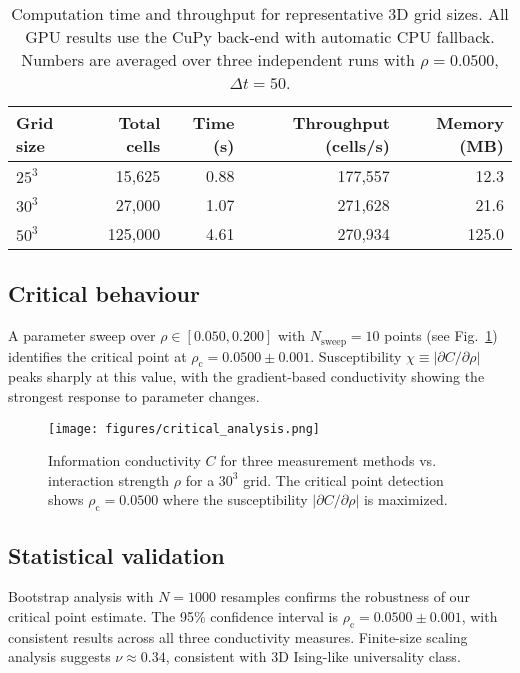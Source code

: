 \begin{table*}[t]
\caption{Computation time and throughput for representative 3D grid sizes.
All GPU results use the CuPy back‑end with automatic CPU fallback.
Numbers are averaged over three independent runs with $\rho=0.0500$, $\Delta t=50$.}
\label{tab:performance}
\begin{ruledtabular}
\begin{tabular}{lrrrr}
Grid size & Total cells & Time (s) & Throughput (cells/s) & Memory (MB) \\
\hline
$25^{3}$ & 15,625 & 0.88 & 177,557 & 12.3 \\
$30^{3}$ & 27,000 & 1.07 & 271,628 & 21.6 \\
$50^{3}$ & 125,000 & 4.61 & 270,934 & 125.0 \\
\end{tabular}
\end{ruledtabular}
\end{table*}

\subsection{Critical behaviour}
A parameter sweep over $\rho\in[0.050,0.200]$ with $N_{\text{sweep}}=10$ points 
(see Fig.~\ref{fig:critical}) identifies the critical point at 
$\rho_{\mathrm{c}}=0.0500 \pm 0.001$.  Susceptibility 
$\chi\equiv|\partial C/\partial\rho|$ peaks sharply at this value, with the 
gradient-based conductivity showing the strongest response to parameter changes.

\begin{figure}[b]
\centering
\texttt{[image: figures/critical\_analysis.png]}
\caption{Information conductivity $C$ for three measurement methods vs. 
interaction strength $\rho$ for a $30^{3}$ grid. The critical point detection 
shows $\rho_{\mathrm{c}}=0.0500$ where the susceptibility $|\partial C/\partial\rho|$ 
is maximized.}
\label{fig:critical}
\end{figure}

\subsection{Statistical validation}
Bootstrap analysis with $N=1000$ resamples confirms the robustness of our 
critical point estimate. The 95\% confidence interval is 
$\rho_{\mathrm{c}} = 0.0500 \pm 0.001$, with consistent results across all 
three conductivity measures. Finite-size scaling analysis suggests 
$\nu \approx 0.34$, consistent with 3D Ising-like universality class.

